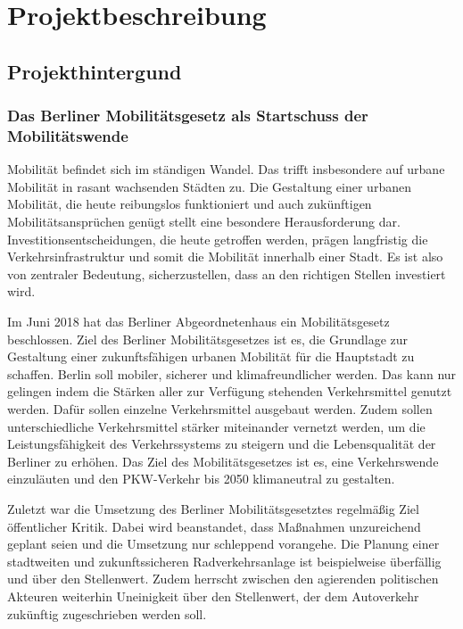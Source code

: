 \newpage
\section{Projektbeschreibung} \label{projektbeschreibung}

\subsection{Projekthintergund}

\subsubsection{Das Berliner Mobilitätsgesetz als Startschuss der Mobilitätswende}

Mobilität befindet sich im ständigen Wandel. Das trifft insbesondere auf urbane Mobilität in rasant wachsenden Städten zu. Die Gestaltung einer urbanen Mobilität, die heute reibungslos funktioniert und auch zukünftigen Mobilitätsansprüchen genügt stellt eine besondere Herausforderung dar. Investitionsentscheidungen, die heute getroffen werden, prägen langfristig die Verkehrsinfrastruktur und somit die Mobilität innerhalb einer Stadt. Es ist also von zentraler Bedeutung, sicherzustellen, dass an den richtigen Stellen investiert wird.

Im Juni 2018 hat das Berliner Abgeordnetenhaus ein Mobilitätsgesetz beschlossen. Ziel des Berliner Mobilitätsgesetzes ist es, die Grundlage zur Gestaltung einer zukunftsfähigen urbanen Mobilität für die Hauptstadt zu schaffen. Berlin soll mobiler, sicherer und klimafreundlicher werden. Das kann nur gelingen indem die Stärken aller zur Verfügung stehenden Verkehrsmittel genutzt werden. Dafür sollen einzelne Verkehrsmittel ausgebaut werden. Zudem sollen unterschiedliche Verkehrsmittel stärker miteinander vernetzt werden, um die Leistungsfähigkeit des Verkehrssystems zu steigern und die Lebensqualität der Berliner zu erhöhen. Das Ziel des Mobilitätsgesetzes ist es, eine Verkehrswende einzuläuten und den PKW-Verkehr bis 2050 klimaneutral zu gestalten.

Zuletzt war die Umsetzung des Berliner Mobilitätsgesetztes regelmäßig Ziel öffentlicher Kritik. Dabei wird beanstandet, dass Maßnahmen unzureichend geplant seien und die Umsetzung nur schleppend vorangehe. Die Planung einer stadtweiten und zukunftssicheren Radverkehrsanlage ist beispielweise überfällig und über den Stellenwert. Zudem herrscht zwischen den agierenden politischen Akteuren weiterhin Uneinigkeit über den Stellenwert, der dem Autoverkehr zukünftig zugeschrieben werden soll.

